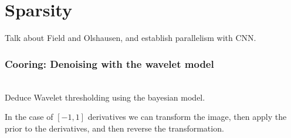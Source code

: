 %
%

%
%
%
%
%
%
%
%
%


\section{Sparsity}

Talk about Field and Olshausen, and establish parallelism with CNN.


\subsubsection{Cooring: Denoising with the wavelet model}
~\\

Deduce Wavelet thresholding using the bayesian model.

In the case of $\left[-1, 1\right]$ derivatives we can transform the image, then apply the prior to the derivatives, and then reverse the transformation.

%
%
%
%
%
%
%
%
%
%
%
%




